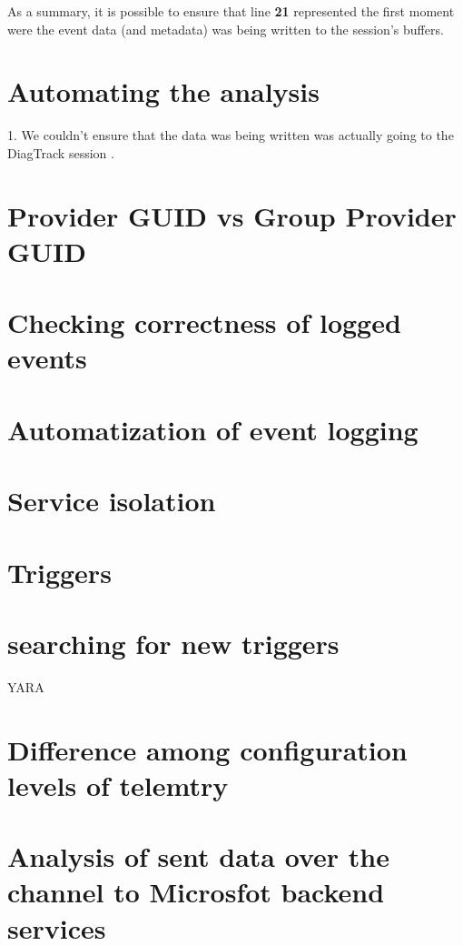As a summary, it is possible to ensure that line {\bfseries 21} represented the first moment were the event data (and metadata) was being written to the session's buffers.


\section{\bfseries Automating the analysis}



\newpage
{\huge 1. We couldn't ensure that the data was being written was actually going to the DiagTrack session .}

\section{Provider GUID vs Group Provider GUID}
\section{Checking correctness of logged events}
\section{Automatization of event logging}
\section{Service isolation}
\section{Triggers}
\section{searching for new triggers} YARA
\section{Difference among configuration levels of telemtry}
\section{Analysis of sent data over the channel to Microsfot backend services}
